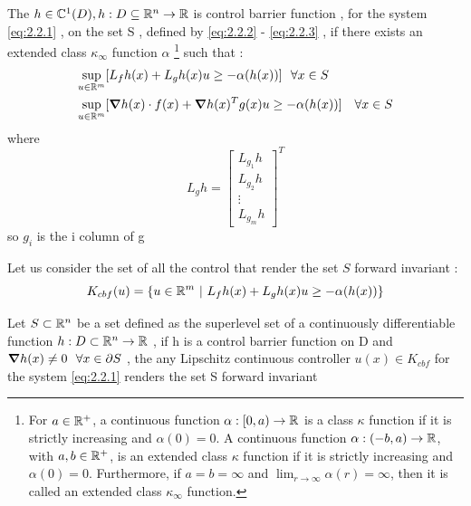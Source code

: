 \begin{definizione}
The $h \in \mathbb{C}^1(D) , h : D \subseteq \mathbb{R}^n \rightarrow \mathbb{R}$ is control barrier function , for the system  \ref{eq:2.2.1} , on the set  S , defined by \ref{eq:2.2.2} - \ref{eq:2.2.3} , if  there exists an extended class  $\kappa_{\infty}$ function $\alpha$  
\footnote{For $a \in \mathbb{R}^+$, a continuous function $\alpha: [0, a) \rightarrow \mathbb{R}$ is a class $\kappa$ function if it is strictly increasing and $\alpha(0) = 0$. A continuous function $\alpha: (-b, a) \rightarrow \mathbb{R}$, with $a, b \in \mathbb{R}^+$, is an extended class $\kappa$ function if it is strictly increasing and $\alpha(0) = 0$. Furthermore, if $a = b = \infty$ and $\lim_{r \rightarrow \infty} \alpha(r) = \infty$, then it is called an extended class $\kappa_\infty$ function.}
such that : 
\begin{align}
	\sup_{u \in \mathbb{R}^m} &[L_f h(x) + L_g h(x) u \geq - \alpha (h(x))]  \ \   \forall x \in S \notag  \\ 
	\sup_{u \in \mathbb{R}^m} &[\grad{h(x)} \cdot f(x) + \grad{h(x)}^T  g(x) u \geq - \alpha (h(x))]\ \ \   \forall x \in S  \label{eq:2.5}
\end{align}
where 
\[L_g h = \begin{bmatrix}
	L_{g_1} h \\
	L_{g_2} h \\
	\vdots \\
	L_{g_m} h 
\end{bmatrix}^T\] so $g_i$ is the i column of g 
 \end{definizione}
 Let us consider the set of all the control that render the set $S$ forward invariant :
 $$K_{cbf}(u)= \{u \in \mathbb{R}^m \ | \ L_f h(x) + L_g h(x) u \geq - \alpha (h(x)) \}$$
 \begin{teo}{}{}
 	Let $S \subset  \mathbb{R}^n$ be a set defined as the superlevel set of  a continuously differentiable function $h:D \subset  \mathbb{R}^n \rightarrow \mathbb{R} $ , if h is a control barrier function on D and $\grad{h(x)} \neq 0 \ \ \forall x \in \partial S  $ , the any Lipschitz continuous controller  $u(x) \in K_{cbf}$ for the system  \ref{eq:2.2.1} renders the set  S forward invariant  
 \end{teo}
